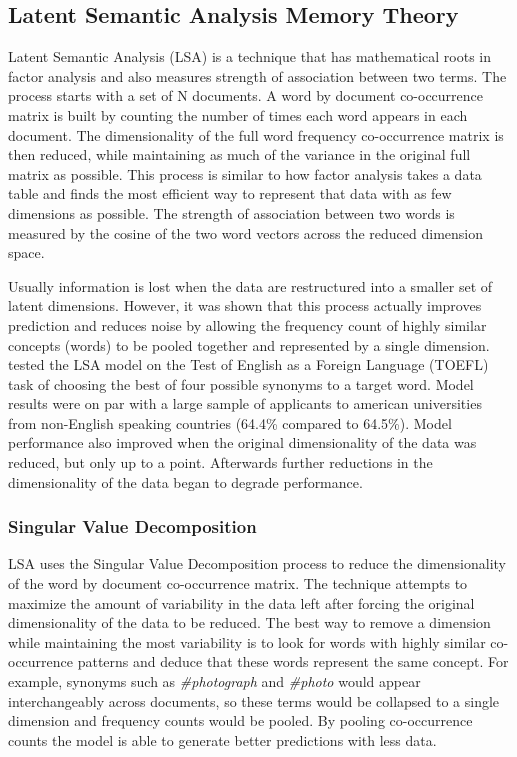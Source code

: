 \documentclass[man,floatsintext,donotrepeattitle]{apa6}
\begin{document}
\subsection{Latent Semantic Analysis Memory Theory}

Latent Semantic Analysis \parencite{Landauer1997} (LSA) is a technique that has mathematical roots in factor analysis and also measures strength of association between two terms.
The process starts with a set of N documents.
A word by document co-occurrence matrix is built by counting the number of times each word appears in each document.
The dimensionality of the full word frequency co-occurrence matrix is then reduced, while maintaining as much of the variance in the original full matrix as possible.
This process is similar to how factor analysis takes a data table and finds the most efficient way to represent that data with as few dimensions as possible.
The strength of association between two words is measured by the cosine of the two word vectors across the reduced dimension space.

Usually information is lost when the data are restructured into a smaller set of latent dimensions.
However, it was shown that this process actually improves prediction and reduces noise by allowing the frequency count of highly similar concepts (words) to be pooled together and represented by a single dimension.
\textcite{Landauer1997} tested the LSA model on the Test of English as a Foreign Language (TOEFL) task of choosing the best of four possible synonyms to a target word.
Model results were on par with a large sample of applicants to american universities from non-English speaking countries (64.4\% compared to 64.5\%).
Model performance also improved when the original dimensionality of the data was reduced, but only up to a point.
Afterwards further reductions in the dimensionality of the data began to degrade performance.

\subsubsection{Singular Value Decomposition}

LSA uses the Singular Value Decomposition process to reduce the dimensionality of the word by document co-occurrence matrix.
The technique attempts to maximize the amount of variability in the data left after forcing the original dimensionality of the data to be reduced.
The best way to remove a dimension while maintaining the most variability is to look for words with highly similar co-occurrence patterns and deduce that these words represent the same concept.
For example, synonyms such as \emph{\#photograph} and \emph{\#photo} would appear interchangeably across documents, so these terms would be collapsed to a single dimension and frequency counts would be pooled.
By pooling co-occurrence counts the model is able to generate better predictions with less data.
\end{document}
